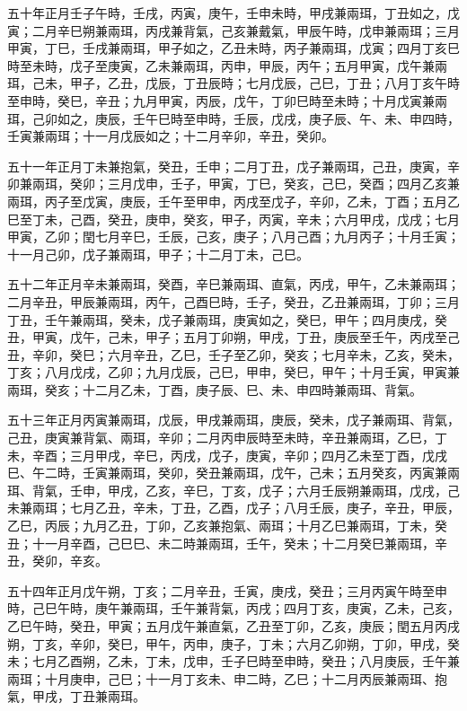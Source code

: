 \begin{pinyinscope}
五十年正月壬子午時，壬戌，丙寅，庚午，壬申未時，甲戌兼兩珥，丁丑如之，戊寅；二月辛巳朔兼兩珥，丙戌兼背氣，己亥兼戴氣，甲辰午時，戊申兼兩珥；三月甲寅，丁巳，壬戌兼兩珥，甲子如之，乙丑未時，丙子兼兩珥，戊寅；四月丁亥巳時至未時，戊子至庚寅，乙未兼兩珥，丙申，甲辰，丙午；五月甲寅，戊午兼兩珥，己未，甲子，乙丑，戊辰，丁丑辰時；七月戊辰，己巳，丁丑；八月丁亥午時至申時，癸巳，辛丑；九月甲寅，丙辰，戊午，丁卯巳時至未時；十月戊寅兼兩珥，己卯如之，庚辰，壬午巳時至申時，壬辰，戊戌，庚子辰、午、未、申四時，壬寅兼兩珥；十一月戊辰如之；十二月辛卯，辛丑，癸卯。

五十一年正月丁未兼抱氣，癸丑，壬申；二月丁丑，戊子兼兩珥，己丑，庚寅，辛卯兼兩珥，癸卯；三月戊申，壬子，甲寅，丁巳，癸亥，己巳，癸酉；四月乙亥兼兩珥，丙子至戊寅，庚辰，壬午至甲申，丙戌至戊子，辛卯，乙未，丁酉；五月乙巳至丁未，己酉，癸丑，庚申，癸亥，甲子，丙寅，辛未；六月甲戌，戊戌；七月甲寅，乙卯；閏七月辛巳，壬辰，己亥，庚子；八月己酉；九月丙子；十月壬寅；十一月己卯，戊子兼兩珥，甲子；十二月丁未，己巳。

五十二年正月辛未兼兩珥，癸酉，辛巳兼兩珥、直氣，丙戌，甲午，乙未兼兩珥；二月辛丑，甲辰兼兩珥，丙午，己酉巳時，壬子，癸丑，乙丑兼兩珥，丁卯；三月丁丑，壬午兼兩珥，癸未，戊子兼兩珥，庚寅如之，癸巳，甲午；四月庚戌，癸丑，甲寅，戊午，己未，甲子；五月丁卯朔，甲戌，丁丑，庚辰至壬午，丙戌至己丑，辛卯，癸巳；六月辛丑，乙巳，壬子至乙卯，癸亥；七月辛未，乙亥，癸未，丁亥；八月戊戌，乙卯；九月戊辰，己巳，甲申，癸巳，甲午；十月壬寅，甲寅兼兩珥，癸亥；十二月乙未，丁酉，庚子辰、巳、未、申四時兼兩珥、背氣。

五十三年正月丙寅兼兩珥，戊辰，甲戌兼兩珥，庚辰，癸未，戊子兼兩珥、背氣，己丑，庚寅兼背氣、兩珥，辛卯；二月丙申辰時至未時，辛丑兼兩珥，乙巳，丁未，辛酉；三月甲戌，辛巳，丙戌，戊子，庚寅，辛卯；四月乙未至丁酉，戊戌巳、午二時，壬寅兼兩珥，癸卯，癸丑兼兩珥，戊午，己未；五月癸亥，丙寅兼兩珥、背氣，壬申，甲戌，乙亥，辛巳，丁亥，戊子；六月壬辰朔兼兩珥，戊戌，己未兼兩珥；七月乙丑，辛未，丁丑，乙酉，戊子；八月壬辰，庚子，辛丑，甲辰，乙巳，丙辰；九月乙丑，丁卯，乙亥兼抱氣、兩珥；十月乙巳兼兩珥，丁未，癸丑；十一月辛酉，己巳巳、未二時兼兩珥，壬午，癸未；十二月癸巳兼兩珥，辛丑，癸卯，辛亥。

五十四年正月戊午朔，丁亥；二月辛丑，壬寅，庚戌，癸丑；三月丙寅午時至申時，己巳午時，庚午兼兩珥，壬午兼背氣，丙戌；四月丁亥，庚寅，乙未，己亥，乙巳午時，癸丑，甲寅；五月戊午兼直氣，乙丑至丁卯，乙亥，庚辰；閏五月丙戌朔，丁亥，辛卯，癸巳，甲午，丙申，庚子，丁未；六月乙卯朔，丁卯，甲戌，癸未；七月乙酉朔，乙未，丁未，戊申，壬子巳時至申時，癸丑；八月庚辰，壬午兼兩珥；十月庚申，己巳；十一月丁亥未、申二時，乙巳；十二月丙辰兼兩珥、抱氣，甲戌，丁丑兼兩珥。


\end{pinyinscope}
